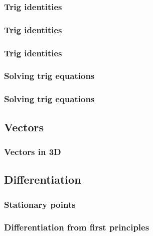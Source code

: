 \documentclass{article}
\begin{document}
\subsubsection{Trig identities}


\subsubsection{Trig identities}


\subsubsection{Trig identities}


\subsubsection{Solving trig equations}


\subsubsection{Solving trig equations}



\subsection{Vectors}

\subsubsection{Vectors in 3D}



\subsection{Differentiation}

\subsubsection{Stationary points}


\subsubsection{Differentiation from first principles}

\end{document}
